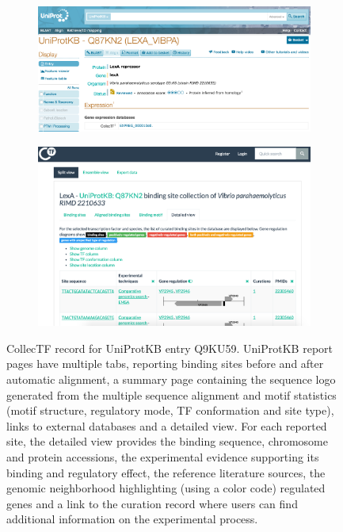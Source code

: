 \begin{figure}
  \centering
  \begin{subfigure}{0.7\textwidth}
    \includegraphics[width=1\textwidth]{figures/chapter2/uniprot}
  \end{subfigure}

  \begin{subfigure}{0.7\textwidth}
    \includegraphics[width=1\textwidth]{figures/chapter2/protein-record}
  \end{subfigure}

  \caption[CollecTF record for UniProtKB entry Q9KU59.]{CollecTF record for
    UniProtKB entry Q9KU59.  UniProtKB report pages have multiple tabs,
    reporting binding sites before and after automatic alignment, a summary
    page containing the sequence logo generated from the multiple sequence
    alignment and motif statistics (motif structure, regulatory mode, TF
    conformation and site type), links to external databases and a detailed
    view. For each reported site, the detailed view provides the binding
    sequence, chromosome and protein accessions, the experimental evidence
    supporting its binding and regulatory effect, the reference literature
    sources, the genomic neighborhood highlighting (using a color code)
    regulated genes and a link to the curation record where users can find
    additional information on the experimental process.}
\label{fig:uniprot-integration}
\end{figure}

